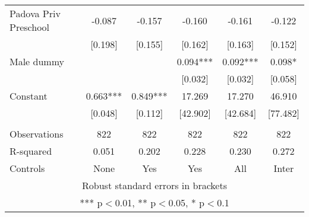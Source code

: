 \begin{tabular}{lccccc}
Padova Priv Preschool & -0.087 & -0.157 & -0.160 & -0.161 & -0.122 \\
 & [0.198] & [0.155] & [0.162] & [0.163] & [0.152] \\
Male dummy &  &  & 0.094*** & 0.092*** & 0.098* \\
 &  &  & [0.032] & [0.032] & [0.058] \\
Constant & 0.663*** & 0.849*** & 17.269 & 17.270 & 46.910 \\
 & [0.048] & [0.112] & [42.902] & [42.684] & [77.482] \\
 &  &  &  &  &  \\
Observations & 822 & 822 & 822 & 822 & 822 \\
R-squared & 0.051 & 0.202 & 0.228 & 0.230 & 0.272 \\
 Controls & None & Yes & Yes & All & Inter \\ \hline
\multicolumn{6}{c}{ Robust standard errors in brackets} \\
\multicolumn{6}{c}{ *** p$<$0.01, ** p$<$0.05, * p$<$0.1} \\
\end{tabular}
